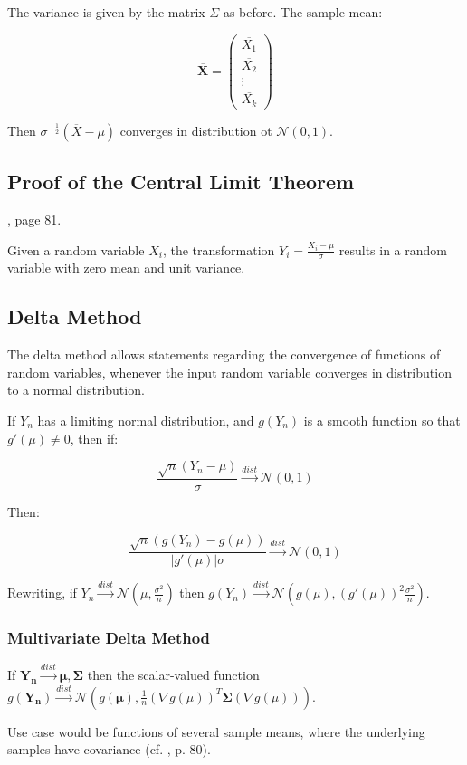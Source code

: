 The variance is given by the matrix $\Sigma$ as before. The sample mean:

\begin{equation}
\overline{\mathbf{X}} = \left(\begin{array}{c}\overline{X_{1}}\\ \overline{X_{2}} \\ \vdots \\ \overline{X_{k}} \end{array}\right)
\end{equation}

Then $\sigma^{-\frac{1}{2}} (\overline{X}-\mu)$ converges in distribution ot $\mathscr{N}(0,1)$.


\subsection{Proof of the Central Limit Theorem}
, page 81.

Given a random variable $X_i$, the transformation $Y_i = \frac{X_i-\mu}{\sigma}$ results in a random variable with zero mean and unit variance. 


\subsection{Delta Method}

The delta method allows statements regarding the convergence of functions of random variables, whenever the input random variable converges in distribution to a normal distribution. 

If $Y_n$ has a limiting normal distribution, and $g(Y_n )$ is a smooth function so that $g'(\mu) \neq 0$, then if:

\begin{equation}
\frac{\sqrt{n}(Y_n - \mu)}{\sigma} \xrightarrow{dist} \mathscr{N}(0,1)
\end{equation}

Then:

\begin{equation}
\frac{\sqrt{n}(g(Y_n)-g(\mu))}{|g'(\mu)|\sigma}\xrightarrow{dist}\mathscr{N}(0,1)
\end{equation}

Rewriting, if $Y_n \xrightarrow{dist}\mathscr{N}(\mu,\frac{\sigma^2}{n})$ then $g(Y_n)\xrightarrow{dist}\mathscr{N}(g(\mu),(g'(\mu))^2\frac{\sigma^2}{n})$.

\subsubsection{Multivariate Delta Method}

If $\mathbf{Y_n} \xrightarrow{dist}\mathscr{\mathbf{\mu},\mathbf{\Sigma}}$ then the scalar-valued function $g(\mathbf{Y_n}) \xrightarrow{dist}\mathscr{N}(g(\mathbf{\mu}),\frac{1}{n} (\nabla g(\mu))^T \mathbf{\Sigma} (\nabla g(\mu)) )$.

Use case would be functions of several sample means, where the underlying samples have covariance (cf. \cite{wasserman2013all}, p. 80).